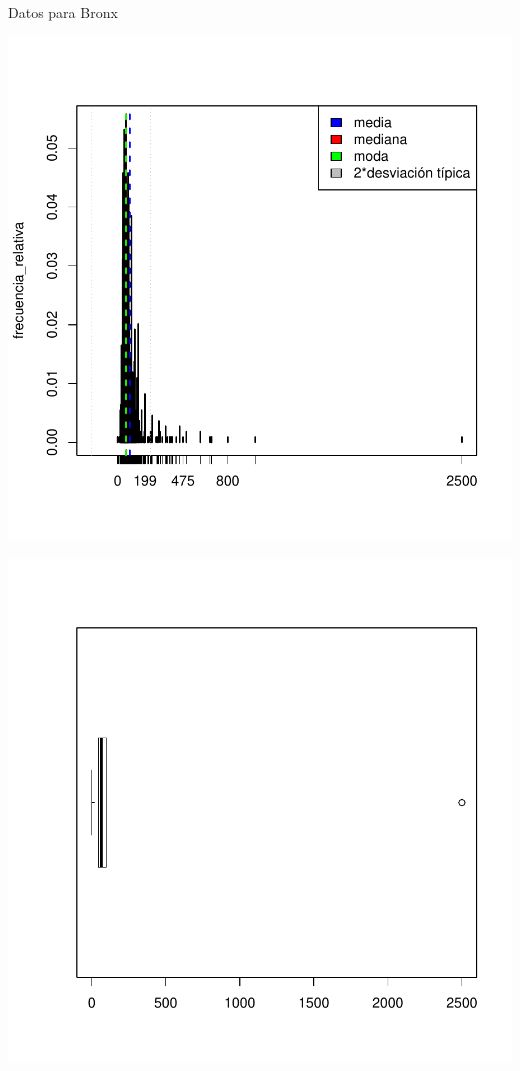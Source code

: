 \documentclass [a4paper] {article}
\begin{document}
Datos para Bronx
\begin{center}
\includegraphics{entrega-037}
\end{center}
\begin{center}
\includegraphics{entrega-038}
\end{center}
\end{document}
